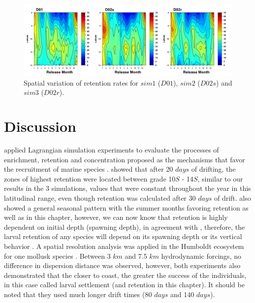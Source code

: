 \begin{center}
\begin{figure}[H]
	\includegraphics[width=1.0\textwidth]{figures/Chap2SpatialVariation.png}
	\centering
	\caption{Spatial variation of retention rates for $sim 1$ ($D01$), $sim 2$ ($D02s$) and $sim 3$ ($D02r$).}
	\label{Chap2SpatialVariation}
\end{figure}
\end{center}

\clearpage
\section{Discussion}\label{Chap2Disc}

\cite{LettPenv2007} applied Lagrangian simulation experiments to evaluate the processes of enrichment, retention and concentration proposed as the mechanisms that favor the recruitment of marine species \citep{Baku1998, Baku2010}. \cite{LettPenv2007} showed that after 20 $days$ of drifting, the zones of highest retention were located between grade 10\textdegree $S$ - 14\textdegree $S$, similar to our results in the 3 simulations, values that were constant throughout the year in this latitudinal range, even though retention was calculated after 30 $days$ of drift. \cite{LettPenv2007} also showed a general seasonal pattern with the summer months favoring retention as well as in this chapter, however, we can now know that retention is highly dependent on initial depth (spawning depth), in agreement with \cite{BrocLett2008}, therefore, the larval retention of any species will depend on its spawning depth or its vertical behavior \citep{OspiPara2012}. A spatial resolution analysis was applied in the Humboldt ecosystem for one mollusk species \citep{GaraKapl2014}. Between 3 $km$ and 7.5 $km$ hydrodynamic forcings, no difference in dispersion distance was observed, however, both experiments also demonstrated that the closer to coast, the greater the success of the individuals, in this case called larval settlement (and retention in this chapter). It should be noted that they used much longer drift times (80 $days$ and 140 $days$).\\

